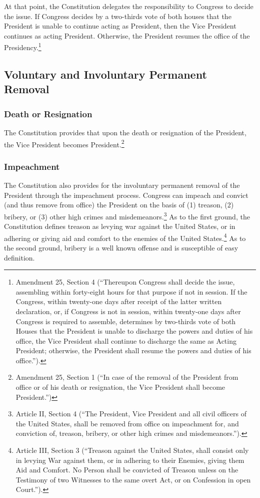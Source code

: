 At that point, the Constitution delegates the responsibility to Congress to decide the issue.  If Congress decides by a two-thirds vote of both houses that the President is unable to continue acting as President, then the Vice President continues as acting President.  Otherwise, the President resumes the office of the Presidency.\footnote{Amendment 25, Section 4 (``Thereupon Congress shall decide the issue, assembling within forty-eight hours for that purpose if not in session. If the Congress, within twenty-one days after receipt of the latter written declaration, or, if Congress is not in session, within twenty-one days after Congress is required to assemble, determines by two-thirds vote of both Houses that the President is unable to discharge the powers and duties of his office, the Vice President shall continue to discharge the same as Acting President; otherwise, the President shall resume the powers and duties of his office.'').}

\subsection{Voluntary and Involuntary Permanent Removal}

\subsubsection{Death or Resignation}
The Constitution provides that upon the death or resignation of the President, the Vice President becomes President.\footnote{Amendment 25, Section 1 (``In case of the removal of the President from office or of his death or resignation, the Vice President shall become President.'')}

\subsubsection{Impeachment}

The Constitution also provides for the involuntary permanent removal of the President through the impeachment process.  Congress can impeach and convict (and thus remove from office) the President on the basis of (1) treason, (2) bribery, or (3) other high crimes and misdemeanors.\footnote{Article II, Section 4 (``The President, Vice President and all civil officers of the United States, shall be removed from office on impeachment for, and conviction of, treason, bribery, or other high crimes and misdemeanors.'').}
As to the first ground, the Constitution defines treason as levying war against the United States, or in adhering or giving aid and comfort to the enemies of the United States.\footnote{Article III, Section 3 (``Treason against the United States, shall consist only in levying War against them, or in adhering to their Enemies, giving them Aid and Comfort. No Person shall be convicted of Treason unless on the Testimony of two Witnesses to the same overt Act, or on Confession in open Court.'').}  As to the second ground, bribery is a well known offense and is susceptible of easy definition.

